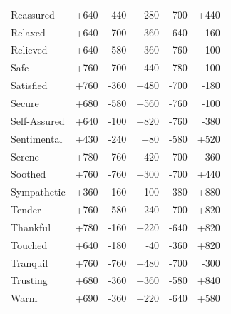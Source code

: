 \begin{longtable}{@{}p{}rrrrr}
Reassured & +640 & -440 & +280 & -700 & +440 \\
Relaxed & +640 & -700 & +360 & -640 & -160 \\
Relieved & +640 & -580 & +360 & -760 & -100 \\
Safe & +760 & -700 & +440 & -780 & -100 \\
Satisfied & +760 & -360 & +480 & -700 & -180 \\
Secure & +680 & -580 & +560 & -760 & -100 \\
Self-Assured & +640 & -100 & +820 & -760 & -380 \\
Sentimental & +430 & -240 & +80 & -580 & +520 \\
Serene & +780 & -760 & +420 & -700 & -360 \\
Soothed & +760 & -760 & +300 & -700 & +440 \\
Sympathetic & +360 & -160 & +100 & -380 & +880 \\
Tender & +760 & -580 & +240 & -700 & +820 \\
Thankful & +780 & -160 & +220 & -640 & +820 \\
Touched & +640 & -180 & -40 & -360 & +820 \\
Tranquil & +760 & -760 & +480 & -700 & -300 \\
Trusting & +680 & -360 & +360 & -580 & +840 \\
Warm & +690 & -360 & +220 & -640 & +580 \\
\end{longtable}
